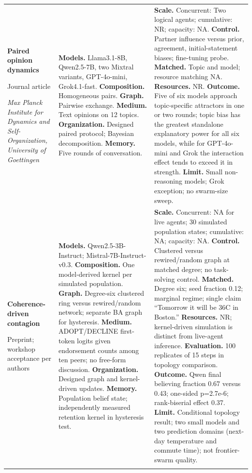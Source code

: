 \begin{longtable}{@{}>{\raggedright\arraybackslash}p{}>{\raggedright\arraybackslash}p{}>{\raggedright\arraybackslash}p{}@{}}
\textbf{Paired opinion dynamics}\par \citep{brockers-opinion-dynamics}\par Journal article\par\emph{Max Planck Institute for Dynamics and Self-Organization, University of Goettingen} & \textbf{Models.} Llama3.1-8B, Qwen2.5-7B, two Mixtral variants, GPT-4o-mini, Grok4.1-fast. \textbf{Composition.} Homogeneous pairs. \textbf{Graph.} Pairwise exchange. \textbf{Medium.} Text opinions on 12 topics. \textbf{Organization.} Designed paired protocol; Bayesian decomposition. \textbf{Memory.} Five rounds of conversation. & \textbf{Scale.} Concurrent: Two logical agents; cumulative: NR; capacity: NA. \textbf{Control.} Partner influence versus prior, agreement, initial-statement biases; fine-tuning probe. \textbf{Matched.} Topic and model; resource matching NA. \textbf{Resources.} NR. \textbf{Outcome.} Five of six models approach topic-specific attractors in one or two rounds; topic bias has the greatest standalone explanatory power for all six models, while for GPT-4o-mini and Grok the interaction effect tends to exceed it in strength. \textbf{Limit.} Small non-reasoning models; Grok exception; no swarm-size sweep. \\ \addlinespace[5pt]
\textbf{Coherence-driven contagion}\par \citep{coherence-driven-contagion}\par Preprint; workshop acceptance per authors & \textbf{Models.} Qwen2.5-3B-Instruct; Mistral-7B-Instruct-v0.3. \textbf{Composition.} One model-derived kernel per simulated population. \textbf{Graph.} Degree-six clustered ring versus rewired/random network; separate BA graph for hysteresis. \textbf{Medium.} ADOPT/DECLINE first-token logits given endorsement counts among ten peers; no free-form discussion. \textbf{Organization.} Designed graph and kernel-driven updates. \textbf{Memory.} Population belief state; independently measured retention kernel in hysteresis test. & \textbf{Scale.} Concurrent: NA for live agents; 30 simulated population states; cumulative: NA; capacity: NA. \textbf{Control.} Clustered versus rewired/random graph at matched degree; no task-solving control. \textbf{Matched.} Degree six; seed fraction 0.12; marginal regime; single claim ``Tomorrow it will be 36\textdegree{}C in Boston.'' \textbf{Resources.} NR; kernel-driven simulation is distinct from live-agent inference. \textbf{Evaluation.} 100 replicates of 15 steps in topology comparison. \textbf{Outcome.} Qwen final believing fraction 0.67 versus 0.43; one-sided p=2.7e-6; rank-biserial effect 0.37. \textbf{Limit.} Conditional topology result; two small models and two prediction domains (next-day temperature and commute time); not frontier-swarm quality. \\ \addlinespace[5pt]

\end{longtable}
